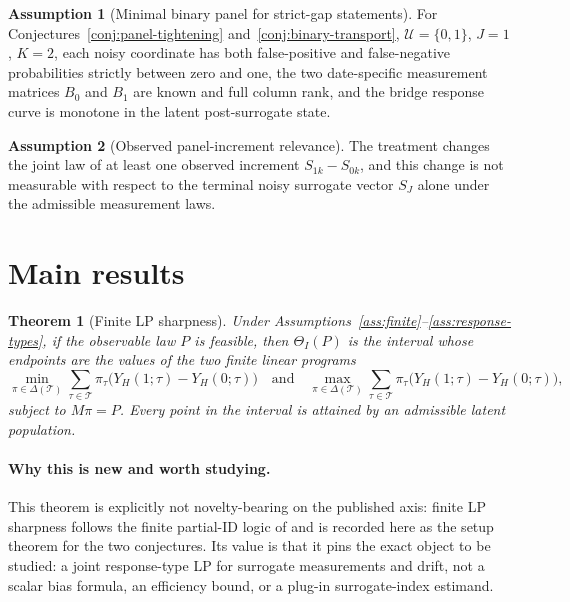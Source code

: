 \documentclass[11pt]{article}
\theoremstyle{definition}
\newtheorem{assumption}{Assumption}
\theoremstyle{plain}
\newtheorem{theorem}{Theorem}
\theoremstyle{remark}
\begin{document}
\begin{assumption}[Minimal binary panel for strict-gap statements]\label{ass:minimal-binary}
For Conjectures~\ref{conj:panel-tightening} and~\ref{conj:binary-transport}, \(\mathcal{U}=\{0,1\}\), \(J=1\), \(K=2\), each noisy coordinate has both false-positive and false-negative probabilities strictly between zero and one, the two date-specific measurement matrices \(B_0\) and \(B_1\) are known and full column rank, and the bridge response curve is monotone in the latent post-surrogate state.
\end{assumption}

\begin{assumption}[Observed panel-increment relevance]\label{ass:increment-relevance}
The treatment changes the joint law of at least one observed increment \(S_{1k}-S_{0k}\), and this change is not measurable with respect to the terminal noisy surrogate vector \(S_J\) alone under the admissible measurement laws.
\end{assumption}

\section{Main results}
\begin{theorem}[Finite LP sharpness]\label{thm:finite-lp-sharpness}
Under Assumptions~\ref{ass:finite}--\ref{ass:response-types}, if the observable law \(P\) is feasible, then \(\Theta_I(P)\) is the interval whose endpoints are the values of the two finite linear programs
\[
  \min_{\pi\in\Delta(\mathcal{T})}\sum_{\tau\in\mathcal{T}}\pi_\tau
      \bigl(Y_H(1;\tau)-Y_H(0;\tau)\bigr)
  \quad\text{and}\quad
  \max_{\pi\in\Delta(\mathcal{T})}\sum_{\tau\in\mathcal{T}}\pi_\tau
      \bigl(Y_H(1;\tau)-Y_H(0;\tau)\bigr),
\]
subject to \(M\pi=P\).  Every point in the interval is attained by an admissible latent population.
\end{theorem}
\paragraph{Why this is new and worth studying.}
This theorem is explicitly not novelty-bearing on the published axis: finite LP sharpness follows the finite partial-ID logic of \citet{Manski1990} and is recorded here as the setup theorem for the two conjectures.  Its value is that it pins the exact object to be studied: a joint response-type LP for surrogate measurements and drift, not a scalar bias formula, an efficiency bound, or a plug-in surrogate-index estimand.
\end{document}
